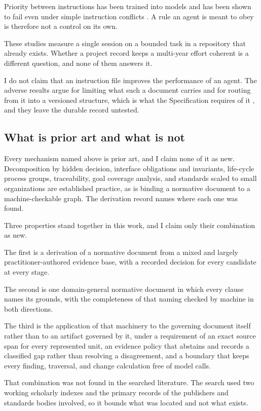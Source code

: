 Priority between instructions has been trained into models \citep{wallace2024} and has been shown to fail even under simple instruction conflicts \citep{geng2025}. A rule an agent is meant to obey is therefore not a control on its own.

These studies measure a single session on a bounded task in a repository that already exists. Whether a project record keeps a multi-year effort coherent is a different question, and none of them answers it.

I do not claim that an instruction file improves the performance of an agent. The adverse results argue for limiting what such a document carries and for routing from it into a versioned structure, which is what the Specification requires of it \citep{pss2026}, and they leave the durable record untested.

\subsection{What is prior art and what is not}

Every mechanism named above is prior art, and I claim none of it as new. Decomposition by hidden decision, interface obligations and invariants, life-cycle process groups, traceability, goal coverage analysis, and standards scaled to small organizations are established practice, as is binding a normative document to a machine-checkable graph. The derivation record names where each one was found.

Three properties stand together in this work, and I claim only their combination as new.

The first is a derivation of a normative document from a mixed and largely practitioner-authored evidence base, with a recorded decision for every candidate at every stage.

The second is one domain-general normative document in which every clause names its grounds, with the completeness of that naming checked by machine in both directions.

The third is the application of that machinery to the governing document itself rather than to an artifact governed by it, under a requirement of an exact source span for every represented unit, an evidence policy that abstains and records a classified gap rather than resolving a disagreement, and a boundary that keeps every finding, traversal, and change calculation free of model calls.

That combination was not found in the searched literature. The search used two working scholarly indexes and the primary records of the publishers and standards bodies involved, so it bounds what was located and not what exists.

